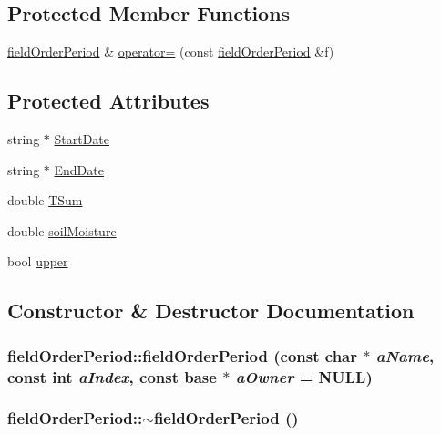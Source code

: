 \subsection*{Protected Member Functions}
\begin{DoxyCompactItemize}
\item 
\hyperlink{classfield_order_period}{fieldOrderPeriod} \& \hyperlink{classfield_order_period_a125328fd2b2dc16b8183dd32a22cb63e}{operator=} (const \hyperlink{classfield_order_period}{fieldOrderPeriod} \&f)
\end{DoxyCompactItemize}
\subsection*{Protected Attributes}
\begin{DoxyCompactItemize}
\item 
string $\ast$ \hyperlink{classfield_order_period_a4b10f8194dab3009b38d66a4e9beb6a6}{StartDate}
\item 
string $\ast$ \hyperlink{classfield_order_period_a78bd38a6d85df0671a546160fb30160e}{EndDate}
\item 
double \hyperlink{classfield_order_period_a042065a246bc0015b304eaecdfa7853a}{TSum}
\item 
double \hyperlink{classfield_order_period_a2530f49c92b1d40b026a818f215182a9}{soilMoisture}
\item 
bool \hyperlink{classfield_order_period_a417b89cfcae7f983c29b9d024a807c5d}{upper}
\end{DoxyCompactItemize}


\subsection{Constructor \& Destructor Documentation}
\hypertarget{classfield_order_period_a7b87f98d6752ac96c548f5d5a03bc246}{
\subsubsection[{fieldOrderPeriod}]{\setlength{\rightskip}{0pt plus 5cm}fieldOrderPeriod::fieldOrderPeriod (const char $\ast$ {\em aName}, \/  const int {\em aIndex}, \/  const {\bf base} $\ast$ {\em aOwner} = {\ttfamily NULL})}}
\label{classfield_order_period_a7b87f98d6752ac96c548f5d5a03bc246}
\hypertarget{classfield_order_period_a06fd0ce9beee7e55bebc167ee3f4ff19}{
\subsubsection[{$\sim$fieldOrderPeriod}]{\setlength{\rightskip}{0pt plus 5cm}fieldOrderPeriod::$\sim$fieldOrderPeriod ()}}
\label{classfield_order_period_a06fd0ce9beee7e55bebc167ee3f4ff19}


